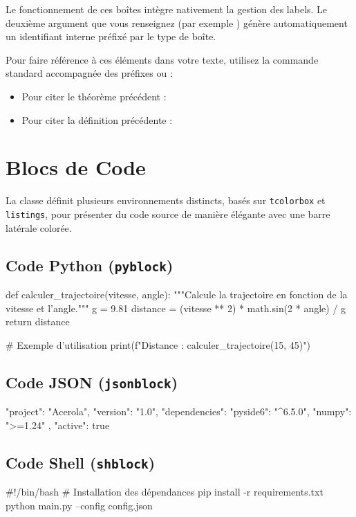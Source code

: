 Le fonctionnement de ces boîtes intègre nativement la gestion des labels. Le deuxième argument que vous renseignez (par exemple ) génère automatiquement un identifiant interne préfixé par le type de boîte.

Pour faire référence à ces éléments dans votre texte, utilisez la commande standard  accompagnée des préfixes  ou  :

\begin{itemize}
    \item Pour citer le théorème précédent : 
    \item Pour citer la définition précédente : 
\end{itemize}

\section{Blocs de Code}

La classe définit plusieurs environnements distincts, basés sur \texttt{tcolorbox} et \texttt{listings}, pour présenter du code source de manière élégante avec une barre latérale colorée.

\subsection{Code Python (\texttt{pyblock})}
\begin{pyblock}
def calculer_trajectoire(vitesse, angle):
    """Calcule la trajectoire en fonction de la vitesse et l'angle."""
    g = 9.81
    distance = (vitesse ** 2) * math.sin(2 * angle) / g
    return distance

# Exemple d'utilisation
print(f"Distance : {calculer_trajectoire(15, 45)}")
\end{pyblock}

\subsection{Code JSON (\texttt{jsonblock})}
\begin{jsonblock}
{
  "project": "Acerola",
  "version": "1.0",
  "dependencies": {
    "pyside6": "^6.5.0",
    "numpy": ">=1.24"
  },
  "active": true
}
\end{jsonblock}

\subsection{Code Shell (\texttt{shblock})}
\begin{shblock}
#!/bin/bash
# Installation des dépendances
pip install -r requirements.txt
python main.py --config config.json
\end{shblock}

